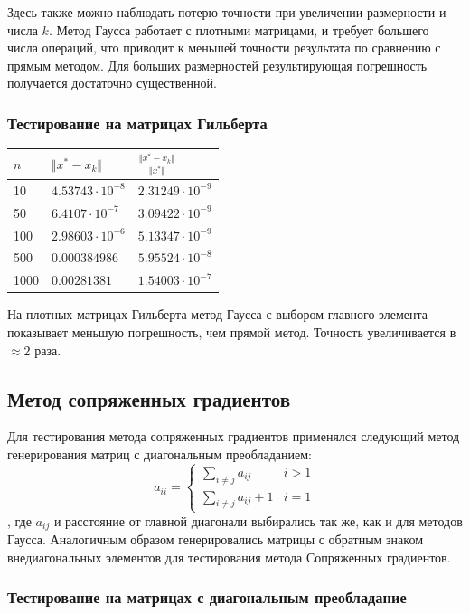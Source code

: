 \documentclass[english]{article}
\begin{document}
Здесь также можно наблюдать потерю точности при увеличении размерности
и числа \(k\). Метод Гаусса работает с плотными матрицами, и требует
большего числа операций, что приводит к меньшей точности результата по
сравнению с прямым методом. Для больших размерностей результирующая
погрешность получается достаточно существенной.

\subsubsection{Тестирование на матрицах Гильберта}
\begin{center}
  \begin{longtable}{l|l|l}
    \(n\) & \(\Vert x^* - x_k \Vert\) & \(\frac{\Vert x^* - x_k \Vert}{\Vert x^* \Vert}\) \\
    \hline
    10 & \(4.53743\cdot 10^{-8}\) & \(2.31249\cdot 10^{-9}\) \\
    50 & \(6.4107\cdot 10^{-7} \) & \(3.09422\cdot 10^{-9}\) \\
    100 & \(2.98603\cdot 10^{-6}\) & \(5.13347\cdot 10^{-9}\) \\
    500 & \(0.000384986\) & \(5.95524\cdot 10^{-8}\) \\
    1000 & \(0.00281381 \) & \(1.54003\cdot 10^{-7}\)
  \end{longtable}
\end{center}

На плотных матрицах Гильберта метод Гаусса с выбором главного элемента
показывает меньшую погрешность, чем прямой метод. Точность
увеличивается в \(\approx 2\) раза.

\subsection{Метод сопряженных градиентов}
Для тестирования метода сопряженных градиентов применялся следующий
метод генерирования матриц с диагональным преобладанием:
\[ a_{ii} = \begin{cases}
  \sum\limits_{i \neq j} a_{ij} & i > 1 \\
  \sum\limits_{i \neq j} a_{ij} + 1 & i = 1
\end{cases} \]
, где \(a_{ij}\) и расстояние от главной диагонали выбирались так же,
как и для методов Гаусса. Аналогичным образом генерировались матрицы с
обратным знаком внедиагональных элементов для тестирования метода
Сопряженных градиентов.
\subsubsection{Тестирование на матрицах с диагональным преобладание}
\end{document}
